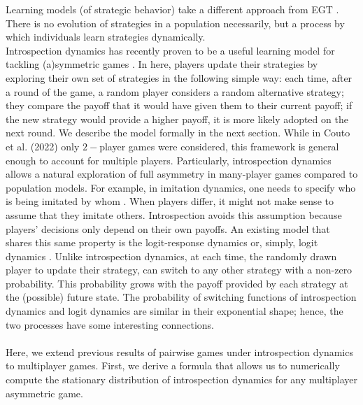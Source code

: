 \documentclass[11pt]{article}
\theoremstyle{plainCl1}
\theoremstyle{plainCl2}
\begin{document}
Learning models (of strategic behavior) take a different approach from EGT \cite{Sandholm:BioSys:1996, Fudenberg:book:1998b, Macy:PNAS:2002, Hofbauer:GEB:2005, Tuyls:bookchapter:2005, Galla:PNAS:2013, Barfuss:PRE:2019, Barfuss:PNAS:2020, Pangallo:GEB:2022}. There is no evolution of strategies in a population necessarily, but a process by which individuals learn strategies dynamically. \\ 

\noindent Introspection dynamics has recently proven to be a useful learning model for tackling (a)symmetric games \cite{Couto:NJP:2022, Hauser:Nature:2019, McAvoy:PNASnexus:2022, Schmid:PlosCB:2022, Ramirez:SciRep:2023}. In here, players update their strategies by exploring their own set of strategies in the following simple way: each time, after a round of the game, a random player considers a random alternative strategy; they compare the payoff that it would have given them to their current payoff; if the new strategy would provide a higher payoff, it is more likely adopted on the next round. We describe the model formally in the next section. 
While in Couto et al. (2022) \cite{Couto:NJP:2022} only $2-$player games were considered, this framework is general enough to account for multiple players.  Particularly, introspection dynamics allows a natural exploration of full asymmetry in many-player games compared to population models. For example, in imitation dynamics, one needs to specify who is being imitated by whom \cite{Vasconcelos:PNAS:2014}. When players differ, it might not make sense to assume that they imitate others. Introspection avoids this assumption because players' decisions only depend on their own payoffs. An existing model that shares this same property is the logit-response dynamics or, simply, logit dynamics \cite{Blume:GEB:1993, Alos-Ferrer:GEB:2010,Auletta:Annual:2011}. Unlike introspection dynamics, at each time, the randomly drawn player to update their strategy, can switch to any other strategy with a non-zero probability. This probability grows with the payoff provided by each strategy at the (possible) future state. The probability of switching functions of introspection dynamics and logit dynamics are similar in their exponential shape; hence, the two processes have some interesting connections. 
\\ \\
\noindent Here, we extend previous results of pairwise games under introspection dynamics  \cite{Couto:NJP:2022} to multiplayer games. 
First, we derive a formula that allows us to numerically compute the stationary distribution of introspection dynamics for any multiplayer asymmetric game. 
\end{document}
